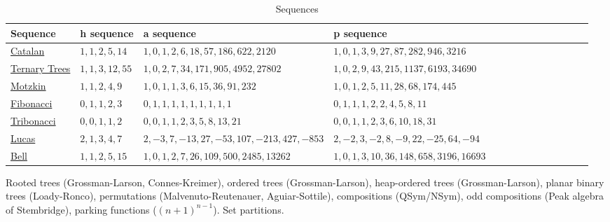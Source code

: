 \documentclass[11pt]{amsart}
\theoremstyle{definition}
\numberwithin{equation}{section}
\begin{document}

{}


 \begin{table}[h]
    \hspace*{-1cm} 
    \begin{tabular}{|l|l|l|l||l|l|l||l|l|l|l||l|l|l|}
        \hline
        Sequence & h sequence & a sequence & p sequence \\
        \hline
        \href{https://oeis.org/A000108}{Catalan} & \(1, 1, 2, 5, 14\) & 
        \(1, 0, 1, 2, 6, 18, 57, 186, 622, 2120\) & 
        \(1, 0, 1, 3, 9, 27, 87, 282, 946, 3216\) \\
        \hline
        \href{https://oeis.org/A001764}{Ternary Trees} & \(1, 1, 3, 12, 55\) & 
        \(1, 0, 2, 7, 34, 171, 905, 4952, 27802\) & 
        \(1, 0, 2, 9, 43, 215, 1137, 6193, 34690\)
        \\
        \hline
        \href{https://oeis.org/A001006}{Motzkin}  & \(1, 1, 2, 4, 9\) & 
        \(1, 0, 1, 1, 3, 6, 15, 36, 91, 232\) & 
        \(1, 0, 1, 2, 5, 11, 28, 68, 174, 445\)

          \\
        \hline
        \href{https://oeis.org/A000045}{ Fibonacci}
        & \(0, 1, 1, 2, 3\) & 
        \(0, 1, 1, 1, 1, 1, 1, 1, 1, 1\) & 
        \(0, 1, 1, 1, 2, 2, 4, 5, 8, 11\)

         \\
        \hline
        \href{https://oeis.org/A000073}{Tribonacci} & \(0, 0, 1, 1, 2\) & 
        \(0, 0, 1, 1, 2, 3, 5, 8, 13, 21\) & 
        \(0, 0, 1, 1, 2, 3, 6, 10, 18, 31\)

             \\
        \hline
        \href{https://oeis.org/A000032}{Lucas} & \(2, 1, 3, 4, 7\) & 
        \(2, -3, 7, -13, 27, -53, 107, -213, 427, -853\) & 
        \(2, -2, 3, -2, 8, -9, 22, -25, 64, -94\)

         \\
        \hline
        \href{https://oeis.org/A000110}{Bell}
         & \(1, 1, 2, 5, 15\) & 
        \(1, 0, 1, 2, 7, 26, 109, 500, 2485, 13262\) & 
        \(1, 0, 1, 3, 10, 36, 148, 658, 3196, 16693\)


   \\
      
        \hline
    \end{tabular}
    \caption{Sequences}
    \label{tab:sequences}
\end{table}

Rooted trees (Grossman-Larson, Connes-Kreimer),
ordered trees (Grossman-Larson),
heap-ordered trees (Grossman-Larson),
planar binary trees (Loady-Ronco), permutations (Malvenuto-Reutenauer, Aguiar-Sottile),
compositions (QSym/NSym), odd compositions (Peak algebra of Stembridge),
parking functions ($(n+1)^{n-1}$).
Set partitions.
\end{document}
